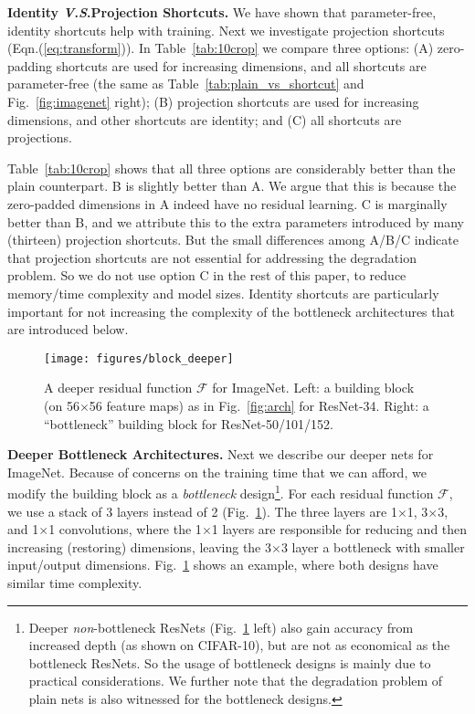 \documentclass{article}
\newcommand{\vs}{\textit{V}.\textit{S}.}
\begin{document}
\vspace{6pt}
\noindent\textbf{Identity \vs Projection Shortcuts.}
We have shown that parameter-free, identity shortcuts help with training. Next we investigate projection shortcuts (Eqn.(\ref{eq:transform})).
In Table~\ref{tab:10crop} we compare three options: (A) zero-padding shortcuts are used for increasing dimensions, and all shortcuts are parameter-free (the same as Table~\ref{tab:plain_vs_shortcut} and Fig.~\ref{fig:imagenet} right); (B) projection shortcuts are used for increasing dimensions, and other shortcuts are identity; and (C) all shortcuts are projections.

Table~\ref{tab:10crop} shows that all three options are considerably better than the plain counterpart.
B is slightly better than A. We argue that this is because the zero-padded dimensions in A indeed have no residual learning. C is marginally better than B, and we attribute this to the extra parameters introduced by many (thirteen) projection shortcuts. But the small differences among A/B/C indicate that projection shortcuts are not essential for addressing the degradation problem. So we do not use option C in the rest of this paper, to reduce memory/time complexity and model sizes. Identity shortcuts are particularly important for not increasing the complexity of the bottleneck architectures that are introduced below.


\begin{figure}[t]
\begin{center}
\hspace{12pt}
\texttt{[image: figures/block\_deeper]}
\end{center}
\caption{A deeper residual function $\mathcal{F}$ for ImageNet. Left: a building block (on 56$\times$56 feature maps) as in Fig.~\ref{fig:arch} for ResNet-34. Right: a ``bottleneck'' building block for ResNet-50/101/152.}
\label{fig:block_deeper}
\vspace{-.6em}
\end{figure}

\vspace{6pt}
\noindent\textbf{Deeper Bottleneck Architectures.} Next we describe our deeper nets for ImageNet. Because of concerns on the training time that we can afford, we modify the building block as a \emph{bottleneck} design\footnote{Deeper \emph{non}-bottleneck ResNets (Fig.~\ref{fig:block_deeper} left) also gain accuracy from increased depth (as shown on CIFAR-10), but are not as economical as the bottleneck ResNets. So the usage of bottleneck designs is mainly due to practical considerations. We further note that the degradation problem of plain nets is also witnessed for the bottleneck designs.}.
For each residual function $\mathcal{F}$, we use a stack of 3 layers instead of 2 (Fig.~\ref{fig:block_deeper}). The three layers are 1$\times$1, 3$\times$3, and 1$\times$1 convolutions, where the 1$\times$1 layers are responsible for reducing and then increasing (restoring) dimensions, leaving the 3$\times$3 layer a bottleneck with smaller input/output dimensions.
Fig.~\ref{fig:block_deeper} shows an example, where both designs have similar time complexity.
\end{document}
